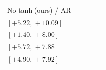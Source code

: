 \begin{table}[t]
\begin{tabular}{@{}lrrrr@{}}
No tanh (ours) / AR & \shortstack[r]{$\textcolor{gainpositive}{\mathbf{+7.62}}$\\$[+5.22,\,+10.09]$} & \shortstack[r]{$\textcolor{gainpositive}{\mathbf{+4.84}}$\\$[+1.40,\,+8.00]$} & \shortstack[r]{$\textcolor{gainpositive}{\mathbf{+6.80}}$\\$[+5.72,\,+7.88]$} & \shortstack[r]{$\textcolor{gainpositive}{\mathbf{+6.42}}$\\$[+4.90,\,+7.92]$} \\[3pt]
\bottomrule\end{tabular}\endgroup\end{table}
